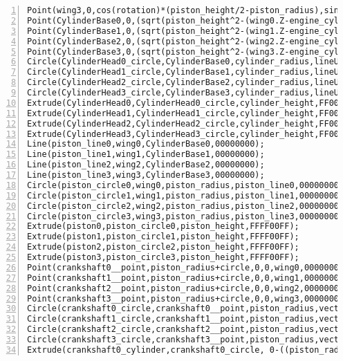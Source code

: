 \begin{lstlisting}[numbers=left]
Point(wing3,0,cos(rotation)*(piston_height/2-piston_radius),sin(rotation)*(piston_height/2-piston_radius),engine_cylinder3,000000FF);
Point(CylinderBase0,0,(sqrt(piston_height^2-(wing0.Z-engine_cylinder0.Z)^2))+wing0.Y-engine_cylinder0.Y,0,engine_cylinder0,00FF00FF);
Point(CylinderBase1,0,(sqrt(piston_height^2-(wing1.Z-engine_cylinder1.Z)^2))+wing1.Y-engine_cylinder1.Y,0,engine_cylinder1,00FF00FF);
Point(CylinderBase2,0,(sqrt(piston_height^2-(wing2.Z-engine_cylinder2.Z)^2))+wing2.Y-engine_cylinder2.Y,0,engine_cylinder2,00FF00FF);
Point(CylinderBase3,0,(sqrt(piston_height^2-(wing3.Z-engine_cylinder3.Z)^2))+wing3.Y-engine_cylinder3.Y,0,engine_cylinder3,00FF00FF);
Circle(CylinderHead0_circle,CylinderBase0,cylinder_radius,lineUP,00000000);
Circle(CylinderHead1_circle,CylinderBase1,cylinder_radius,lineUP,00000000);
Circle(CylinderHead2_circle,CylinderBase2,cylinder_radius,lineUP,00000000);
Circle(CylinderHead3_circle,CylinderBase3,cylinder_radius,lineUP,00000000);
Extrude(CylinderHead0,CylinderHead0_circle,cylinder_height,FF00FFFF);
Extrude(CylinderHead1,CylinderHead1_circle,cylinder_height,FF00FFFF);
Extrude(CylinderHead2,CylinderHead2_circle,cylinder_height,FF00FFFF);
Extrude(CylinderHead3,CylinderHead3_circle,cylinder_height,FF00FFFF);
Line(piston_line0,wing0,CylinderBase0,00000000);
Line(piston_line1,wing1,CylinderBase1,00000000);
Line(piston_line2,wing2,CylinderBase2,00000000);
Line(piston_line3,wing3,CylinderBase3,00000000);
Circle(piston_circle0,wing0,piston_radius,piston_line0,00000000);
Circle(piston_circle1,wing1,piston_radius,piston_line1,00000000);
Circle(piston_circle2,wing2,piston_radius,piston_line2,00000000);
Circle(piston_circle3,wing3,piston_radius,piston_line3,00000000);
Extrude(piston0,piston_circle0,piston_height,FFFF00FF);
Extrude(piston1,piston_circle1,piston_height,FFFF00FF);
Extrude(piston2,piston_circle2,piston_height,FFFF00FF);
Extrude(piston3,piston_circle3,piston_height,FFFF00FF);
Point(crankshaft0__point,piston_radius+circle,0,0,wing0,00000000);
Point(crankshaft1__point,piston_radius+circle,0,0,wing1,00000000);
Point(crankshaft2__point,piston_radius+circle,0,0,wing2,00000000);
Point(crankshaft3__point,piston_radius+circle,0,0,wing3,00000000);
Circle(crankshaft0_circle,crankshaft0__point,piston_radius,vectorLeft,0000FF00);
Circle(crankshaft1_circle,crankshaft1__point,piston_radius,vectorLeft,0000FF00);
Circle(crankshaft2_circle,crankshaft2__point,piston_radius,vectorLeft,0000FF00);
Circle(crankshaft3_circle,crankshaft3__point,piston_radius,vectorLeft,0000FF00);
Extrude(crankshaft0_cylinder,crankshaft0_circle, 0-((piston_radius+circle)*2),00FFFFFF);

\end{lstlisting}
